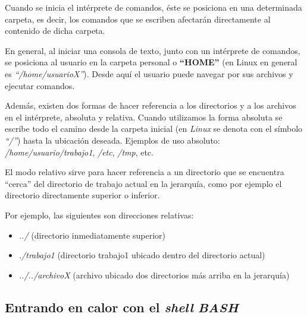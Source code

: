\documentclass[12pt]{article}
\newcommand{\bash}{\textbf{\emph{BASH}}}
\begin{document}
Cuando se inicia el intérprete de comandos, éste se posiciona en una
determinada carpeta, es decir, los comandos que se escriben afectarán
directamente al contenido de dicha carpeta.

En general, al iniciar una consola de texto, junto con un intérprete de
comandos, se posiciona al usuario en la carpeta personal o \textbf{``HOME''}
(en Linux en general es \emph{``/home/usuarioX''}). Desde aquí el usuario
puede navegar por sus archivos y ejecutar comandos.

Además, existen dos formas de hacer referencia a los directorios y a los
archivos en el intérprete, absoluta y relativa. Cuando utilizamos la forma
absoluta se escribe todo el camino desde la carpeta inicial (en \emph{Linux}
se denota con el símbolo \emph{``/''}) hasta la ubicación deseada. Ejemplos de
uso absoluto: \emph{/home/usuario/trabajo1}, \emph{/etc}, \emph{/tmp}, etc.

El modo relativo sirve para hacer referencia a un directorio que se encuentra
``cerca'' del directorio de trabajo actual en la jerarquía, como por ejemplo
el directorio directamente superior o inferior.

Por ejemplo, las siguientes son direcciones relativas:

\vspace{-2\topsep}
\begin{itemize}

    \itemsep2pt \parskip0pt 

    \item \emph{../} (directorio inmediatamente superior)

    \item \emph{./trabajo1} (directorio trabajo1 ubicado dentro del directorio
        actual)

    \item \emph{../../archivoX} (archivo ubicado dos directorios más arriba en
        la jerarquía)

\end{itemize}

\subsection{Entrando en calor con el \emph{shell} \bash}
\end{document}
